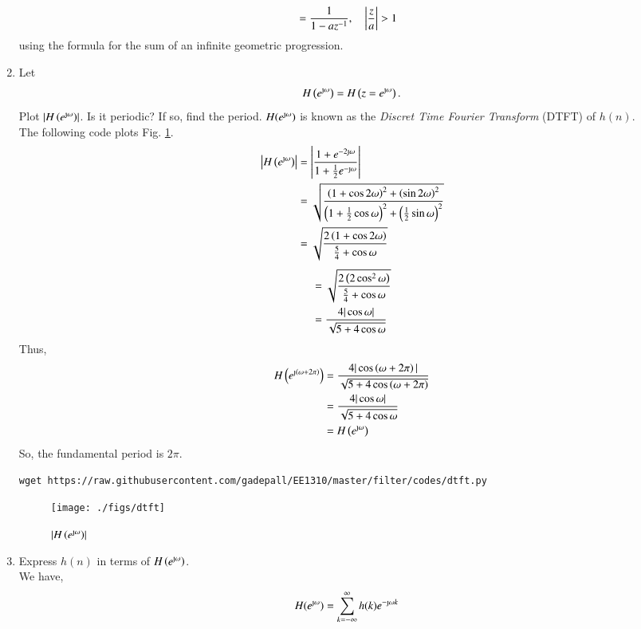 \documentclass[journal,12pt,twocolumn]{IEEEtran}
\renewcommand\thesection{\arabic{section}}
\begin{document}
\begin{enumerate}[label=\thesection.\arabic*]
\begin{align}
&=\frac{1}{1-az^{-1}}, \quad \left\vert\frac{z}{a}\right\vert > 1
\end{align}
using the formula for the sum of an infinite geometric progression.
\item 
Let
\begin{equation}
H\brak{e^{\text{\j} \omega}} = H\brak{z = e^{\text{\j} \omega}}.
\end{equation}
Plot $\abs{H\brak{e^{\text{\j} \omega}}}$.  Is it periodic? If so, find the period. $H(e^{\text{\j} \omega})$ is
known as the {\em Discret Time Fourier Transform} (DTFT) of $h(n)$.
\\
\solution The following code plots Fig. \ref{fig:dtft}.
\begin{align}
	\left|H\brak{e^{\text{\j}\omega}}\right| &= \left|\frac{1 + e^{-2\text{\j}\omega}}{1 + \frac{1}{2}e^{-\text{\j}\omega}}\right| \\
											 &= \sqrt{\frac{\brak{1 + \cos{2\omega}}^2 + \brak{\sin{2\omega}}^2}{\brak{1 + \frac{1}{2}\cos{\omega}}^2 + \brak{\frac{1}{2}\sin{\omega}}^2}} \\
											 &= \sqrt{\frac{2\brak{1 + \cos{2\omega}}}{\frac{5}{4} + \cos{\omega}}}				  		 
\end{align}
\begin{align}
									&= \sqrt{\frac{2\left(2\cos^2{\omega}\right)}{\frac{5}{4} + \cos{\omega}}} \\
									&= \frac{4|\cos{\omega}|}{\sqrt{5 + 4\cos{\omega}}}
\end{align}
Thus,
\begin{align}
	H\brak{e^{\text{\j}\brak{\omega + 2\pi}}} &= \frac{4|\cos\brak{\omega + 2\pi}|}{\sqrt{5 + 4\cos\brak{\omega + 2\pi}}} \\
											   &= \frac{4|\cos{\omega}|}{\sqrt{5 + 4\cos{\omega}}} \\
											   &= H\brak{e^{\text{\j}\omega}}
\end{align}
So, the fundamental period is $2\pi$.

\begin{lstlisting}
wget https://raw.githubusercontent.com/gadepall/EE1310/master/filter/codes/dtft.py
\end{lstlisting}
\begin{figure}[!ht]
\centering
\texttt{[image: ./figs/dtft]}
\caption{$\abs{H\brak{e^{\text{\j}\omega}}}$}
\label{fig:dtft}
\end{figure}
\item Express $h(n)$ in terms of $H\brak{e^{\text{\j} \omega}}$.\\
\solution We have,
\begin{align}
	H(e^{\text{\j}\omega}) &= \sum_{k = -\infty}^{\infty}h(k)e^{-\text{\j}\omega k}
\end{align}


\end{enumerate}
\end{document}
